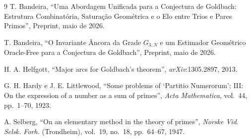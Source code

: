 \documentclass[12pt, a4paper]{article}
\begin{document}
	\begin{thebibliography}{9}
		T. Bandeira,
		``Uma Abordagem Unificada para a Conjectura de Goldbach: Estrutura Combinatória,
		Saturação Geométrica e o Elo entre Trios e Pares Primos'',
		Preprint, maio de 2026.
		
		T. Bandeira,
		``O Invariante Âncora da Grade $G_{3,N}$ e um Estimador Geométrico Oracle-Free
		para a Conjectura de Goldbach'',
		Preprint, maio de 2026.
		
		H. A. Helfgott,
		``Major arcs for Goldbach's theorem'',
		\textit{arXiv}:1305.2897, 2013.
		
		G. H. Hardy e J. E. Littlewood,
		``Some problems of `Partitio Numerorum'; III: On the expression of a number
		as a sum of primes'',
		\textit{Acta Mathematica}, vol.~44, pp.~1--70, 1923.
		
		A. Selberg,
		``On an elementary method in the theory of primes'',
		\textit{Norske Vid. Selsk. Forh.} (Trondheim), vol.~19, no.~18, pp.~64--67, 1947.
	\end{thebibliography}
	
\end{document}
